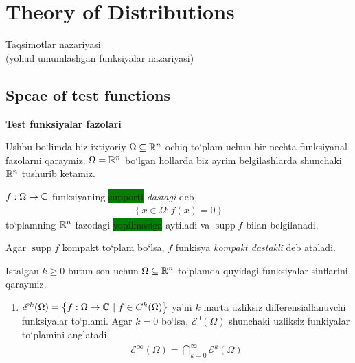 \section{Theory of Distributions}

\begin{center}
    \Large Taqsimotlar nazariyasi \\
    (yohud umumlashgan funksiyalar nazariyasi)
\end{center}

\subsection{Spcae of test functions}
\textbf{Test funksiyalar fazolari}

Ushbu bo`limda biz ixtiyoriy $\Omega\subseteq {\mathbb{R}^{n}}$ ochiq to`plam uchun bir nechta funksiyanal fazolarni qaraymiz. $\Omega={\mathbb{R}^{n}}$ bo`lgan hollarda biz ayrim belgilashlarda shunchaki ${\mathbb{R}^{n}}$ tushurib ketamiz. 

\begin{definition}
    $f:\Omega \rightarrow \mathbb{C} $ funksiyaning \colorbox{green}{supporti} \textit{dastagi} deb
    \begin{align}
        \left\{x\in \Omega: f(x)=0  \right\}
    \end{align}
    to`plamning ${\mathbb{R}^{n}}$ fazodagi \colorbox{green}{yopilmasiga} aytiladi va $\operatorname{supp}f$ bilan belgilanadi. 

    Agar $\operatorname{supp}f$ kompakt to`plam bo`lsa, $f$ funkisya \textit{kompakt dastakli} deb ataladi.
\end{definition}

Istalgan $k\ge 0$ butun son uchun $\Omega\subseteq{\mathbb{R}^{n}}$ to`plamda quyidagi funksiyalar sinflarini qaraymiz.

\begin{enumerate}
    \item $\mathscr{E}^k(\Omega)=\left\{f:\Omega\rightarrow \mathbb{C}\,  \left|\right. f\in C^k(\Omega)\right\}$ ya'ni $k$ marta uzliksiz differensiallanuvchi funk\-si\-yalar to`plami. Agar $k=0$ bo`lsa, $\mathscr{E}^0(\Omega)$ shunchaki uzliksiz funkiyalar to`plamini anglatadi.
    \begin{align}
        \mathscr{E}^\infty(\Omega)=\bigcap\limits_{k=0}^{\infty}\mathscr{E}^k(\Omega)
    \end{align}
\end{enumerate}